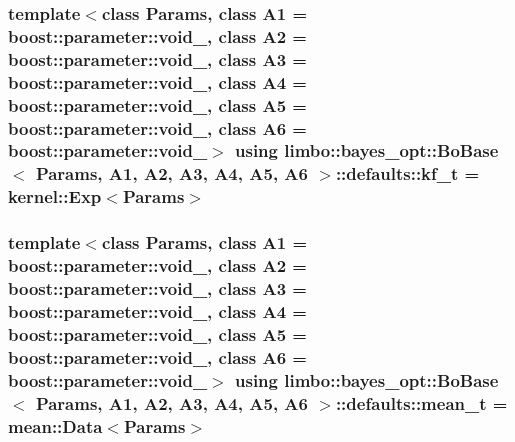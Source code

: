 \subsubsection[{kf\+\_\+t}]{\setlength{\rightskip}{0pt plus 5cm}template$<$class Params, class A1 = boost\+::parameter\+::void\+\_\+, class A2 = boost\+::parameter\+::void\+\_\+, class A3 = boost\+::parameter\+::void\+\_\+, class A4 = boost\+::parameter\+::void\+\_\+, class A5 = boost\+::parameter\+::void\+\_\+, class A6 = boost\+::parameter\+::void\+\_\+$>$ using {\bf limbo\+::bayes\+\_\+opt\+::\+Bo\+Base}$<$ Params, A1, A2, A3, A4, A5, A6 $>$\+::{\bf defaults\+::kf\+\_\+t} =  {\bf kernel\+::\+Exp}$<$Params$>$}\label{structlimbo_1_1bayes__opt_1_1_bo_base_1_1defaults_a74f559358b99209461a1aac1e0dacb1f}
\hypertarget{structlimbo_1_1bayes__opt_1_1_bo_base_1_1defaults_ae8b922abc8e126f785e1001342cf47ae}{}
\subsubsection[{mean\+\_\+t}]{\setlength{\rightskip}{0pt plus 5cm}template$<$class Params, class A1 = boost\+::parameter\+::void\+\_\+, class A2 = boost\+::parameter\+::void\+\_\+, class A3 = boost\+::parameter\+::void\+\_\+, class A4 = boost\+::parameter\+::void\+\_\+, class A5 = boost\+::parameter\+::void\+\_\+, class A6 = boost\+::parameter\+::void\+\_\+$>$ using {\bf limbo\+::bayes\+\_\+opt\+::\+Bo\+Base}$<$ Params, A1, A2, A3, A4, A5, A6 $>$\+::{\bf defaults\+::mean\+\_\+t} =  {\bf mean\+::\+Data}$<$Params$>$}\label{structlimbo_1_1bayes__opt_1_1_bo_base_1_1defaults_ae8b922abc8e126f785e1001342cf47ae}
\hypertarget{structlimbo_1_1bayes__opt_1_1_bo_base_1_1defaults_aa9a30c408b869fd46861b028b6325b4a}{}
